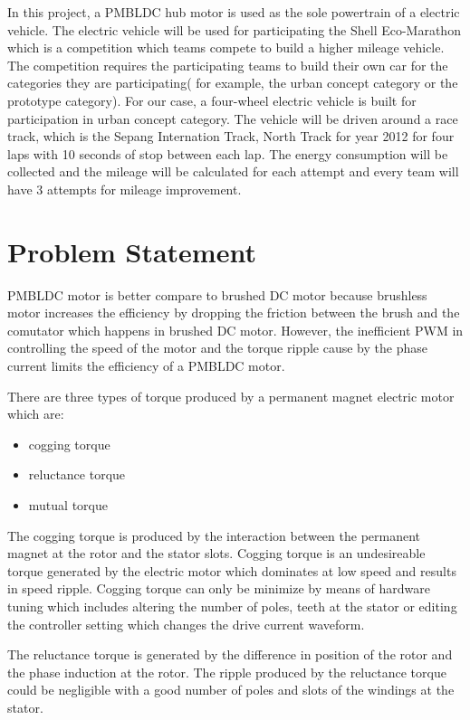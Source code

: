 In this project, a PMBLDC hub motor is used as the sole powertrain of a electric vehicle. The electric vehicle will be used for participating the Shell Eco-Marathon which is a competition which teams compete to build a higher mileage vehicle. The competition requires the participating teams to build their own car for the categories they are participating( for example, the urban concept category or the prototype category). For our case, a four-wheel electric vehicle is built for participation in urban concept category. The vehicle will be driven around a race track, which is the Sepang Internation Track, North Track for year 2012 for four laps with 10 seconds of stop between each lap. The energy consumption will be collected and the mileage will be calculated for each attempt and every team will have 3 attempts for mileage improvement.

\section{Problem Statement}
PMBLDC motor is better compare to brushed DC motor because brushless motor increases the efficiency by dropping the friction between the brush and the comutator which happens in brushed DC motor. However, the inefficient PWM in controlling the speed of the motor and the torque ripple cause by the phase current limits the efficiency of a PMBLDC motor.

There are three types of torque produced by a permanent magnet electric motor which are:

\begin{itemize}
	\item cogging torque
	\item reluctance torque
	\item mutual torque
\end{itemize}

The cogging torque is produced by the interaction between the permanent magnet at the rotor and the stator slots. Cogging torque is an undesireable torque generated by the electric motor which dominates at low speed and results in speed ripple. Cogging torque can only be minimize by means of hardware tuning which includes altering the number of poles, teeth at the stator or editing the controller setting which changes the drive current waveform.

The reluctance torque is generated by the difference in position of the rotor and the phase induction at the rotor. The ripple produced by the reluctance torque could be negligible with a good number of poles and slots of the windings at the stator.

